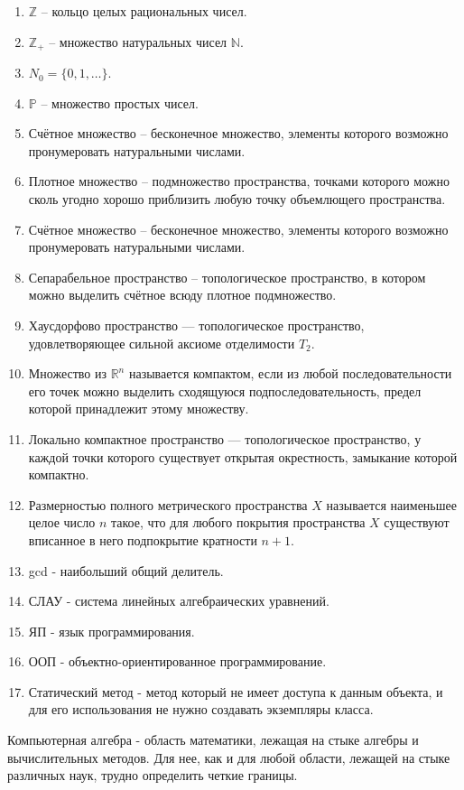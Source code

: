 \documentclass[master, och, diploma, times]{sty/SCWorks}
\theoremstyle{plain}
\theoremstyle{definition}
\begin{document}
\begin{enumerate}
	\item $\mathbb {Z}$ -- кольцо целых рациональных чисел.
	\item $\mathbb {Z}_{+}$ -- множество натуральных чисел $\mathbb {N}$.
	\item ${N}_0=\{0,1,\dots\}$.
	\item $\mathbb {P}$ -- множество простых чисел.
	\item Счётное множество -- бесконечное множество, элементы которого возможно пронумеровать натуральными числами.
	\item Плотное множество -- подмножество пространства, точками которого можно сколь угодно хорошо приблизить любую точку объемлющего пространства.
	\item Счётное множество -- бесконечное множество, элементы которого возможно пронумеровать натуральными числами.
	\item Сепарабельное пространство -- топологическое пространство, в котором можно выделить счётное всюду плотное подмножество.
	\item Хаусдорфово пространство — топологическое пространство, удовлетворяющее сильной аксиоме отделимости $T_2$.
	\item Множество из $\mathbb {R}^n$ называется компактом, если из любой последовательности его точек можно выделить сходящуюся подпоследовательность, предел которой принадлежит этому множеству.
	\item Локально компактное пространство — топологическое пространство, у каждой точки которого существует открытая окрестность, замыкание которой компактно.
	\item Размерностью полного метрического пространства $X$ называется наименьшее целое число $n$ такое, что для любого покрытия пространства $X$ существуют вписанное в него подпокрытие кратности $n+1$.
	\item gcd - наибольший общий делитель.
	\item СЛАУ - система линейных алгебраических уравнений.
	\item ЯП - язык программирования.
	\item ООП - объектно-ориентированное программирование.
	\item Статический метод - метод который не имеет доступа к данным объекта, и для его использования не нужно создавать экземпляры класса.
\end{enumerate}

\intro

Компьютерная алгебра - область математики, лежащая на стыке алгебры и вычислительных методов. Для нее, как и для любой области, лежащей на стыке различных наук, трудно определить четкие границы.
\end{document}
